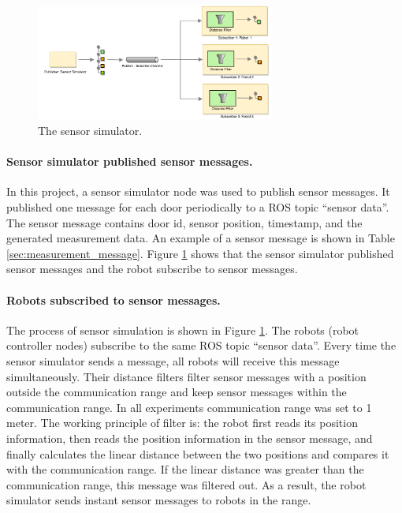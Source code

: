 \begin{figure}
\centering
\includegraphics[width = 0.7\textwidth]{content/images/ch4/sensor_simulator.drawio.png}
\caption{The sensor simulator.}
\label{fig:sensor_simulator}
\end{figure}

\paragraph{Sensor simulator published sensor messages.}
In this project, a sensor simulator node was used to publish sensor messages. It published one message for each door periodically to a ROS topic ``sensor data''. The sensor message contains door id, sensor position, timestamp, and the generated measurement data. An example of a sensor message is shown in Table  \ref{sec:measurement_message}. 
Figure \ref{fig:sensor_simulator} shows that the sensor simulator published sensor messages and the robot subscribe to sensor messages.

\paragraph{Robots subscribed to sensor messages.}
The process of sensor simulation is shown in Figure \ref{fig:sensor_simulator}. The robots (robot controller nodes) subscribe to the same ROS topic ``sensor data''. Every time the sensor simulator sends a message, all robots will receive this message simultaneously. Their distance filters filter sensor messages with a position outside the communication range and keep sensor messages within the communication range. In all experiments communication range was set to 1 meter.  The working principle of filter is: the robot first reads its position information, then reads the position information in the sensor message, and finally calculates the linear distance between the two positions and compares it with the communication range. If the linear distance was greater than the communication range, this message was filtered out. 
As a result, the robot simulator sends instant sensor messages to robots in the range. 

